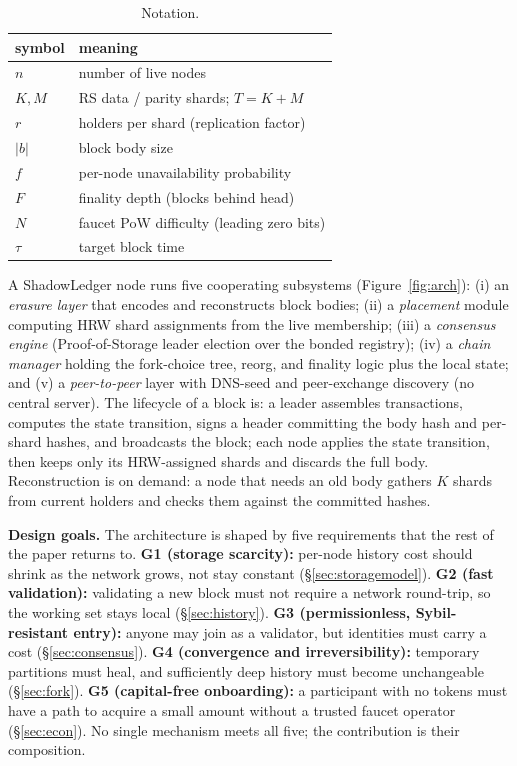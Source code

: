\begin{table}[t]
\centering
\caption{Notation.}
\label{tab:notation}
\small
\begin{tabular}{ll}
\toprule
symbol & meaning \\
\midrule
$n$ & number of live nodes \\
$K,M$ & RS data / parity shards; $T=K{+}M$ \\
$r$ & holders per shard (replication factor) \\
$|b|$ & block body size \\
$f$ & per-node unavailability probability \\
$F$ & finality depth (blocks behind head) \\
$N$ & faucet PoW difficulty (leading zero bits) \\
$\tau$ & target block time \\
\bottomrule
\end{tabular}
\end{table}

A ShadowLedger node runs five cooperating subsystems (Figure~\ref{fig:arch}): (i) an \emph{erasure layer} that encodes
and reconstructs block bodies; (ii) a \emph{placement} module computing HRW shard assignments
from the live membership; (iii) a \emph{consensus engine} (Proof-of-Storage leader election
over the bonded registry); (iv) a \emph{chain manager} holding the fork-choice tree, reorg, and
finality logic plus the local state; and (v) a \emph{peer-to-peer} layer with DNS-seed and
peer-exchange discovery (no central server). The lifecycle of a block is: a leader assembles
transactions, computes the state transition, signs a header committing the body hash and
per-shard hashes, and broadcasts the block; each node applies the state transition, then keeps
only its HRW-assigned shards and discards the full body. Reconstruction is on demand: a node
that needs an old body gathers $K$ shards from current holders and checks them against the
committed hashes.

\textbf{Design goals.} The architecture is shaped by five requirements that the rest of the paper
returns to. \textbf{G1 (storage scarcity):} per-node history cost should shrink as the network
grows, not stay constant (\S\ref{sec:storagemodel}). \textbf{G2 (fast validation):} validating a
new block must not require a network round-trip, so the working set stays local
(\S\ref{sec:history}). \textbf{G3 (permissionless, Sybil-resistant entry):} anyone may join as a
validator, but identities must carry a cost (\S\ref{sec:consensus}). \textbf{G4 (convergence and
irreversibility):} temporary partitions must heal, and sufficiently deep history must become
unchangeable (\S\ref{sec:fork}). \textbf{G5 (capital-free onboarding):} a participant with no
tokens must have a path to acquire a small amount without a trusted faucet operator
(\S\ref{sec:econ}). No single mechanism meets all five; the contribution is their composition.
